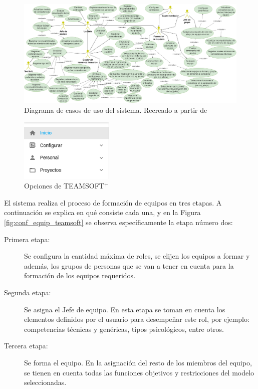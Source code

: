 \begin{figure}[H]
	\hspace{-1.5cm}
	\includegraphics[width=1.2\textwidth]{figuras/diagrama_CUTeamSoft.png} 
	\caption[Diagrama de casos de uso del sistema]{Diagrama de casos de uso del sistema. Recreado a partir de \cite{Duran2019}}  \label{fig:cuteamsoft}
\end{figure}


\begin{figure}[H]
	\centering
	\includegraphics[width=0.4\textwidth]{figuras/opciones_team_soft.png} 
	\caption{Opciones de TEAMSOFT$^+$}\label{fig:opcines_teamsoft}
\end{figure}

El sistema realiza el proceso de formación de equipos en tres etapas. A continuación se explica en qué consiste cada una, y en la Figura \ref{fig:conf_equip_teamsoft} se observa específicamente la etapa número dos:
\begin{description}
	\item[Primera etapa:] Se configura la cantidad máxima de roles, se elijen los equipos a formar y además, los grupos de personas que se van a tener en cuenta para la formación de los equipos requeridos.
	\item[Segunda etapa:] Se asigna el Jefe de equipo. En esta etapa se toman en cuenta los elementos definidos por el usuario para desempeñar este rol, por ejemplo: competencias técnicas y genéricas, tipos psicológicos, entre otros.
	\item[Tercera etapa:] Se forma el equipo. En la asignación del resto de los miembros del equipo, se tienen en cuenta todas las funciones objetivos y restricciones del modelo seleccionadas.
\end{description}

